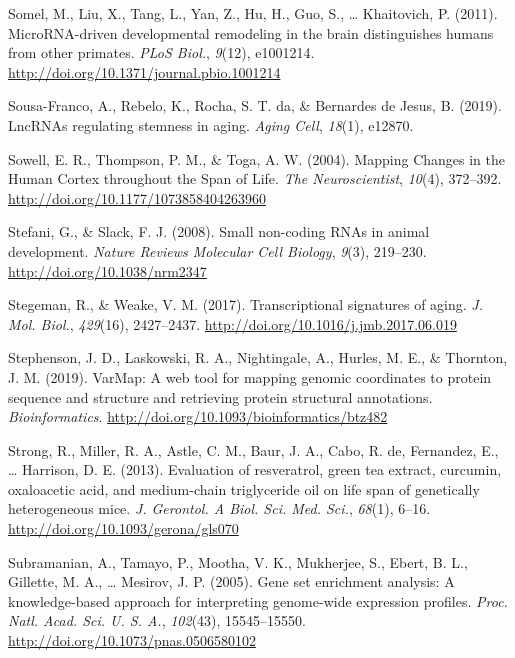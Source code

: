 \documentclass[12pt,twoside]{unicam}
\begin{document}
\begin{cslreferences}
\leavevmode\hypertarget{ref-Somel2011}{}%
Somel, M., Liu, X., Tang, L., Yan, Z., Hu, H., Guo, S., \ldots{} Khaitovich, P. (2011). MicroRNA-driven developmental remodeling in the brain distinguishes humans from other primates. \emph{PLoS Biol.}, \emph{9}(12), e1001214. \url{http://doi.org/10.1371/journal.pbio.1001214}

\leavevmode\hypertarget{ref-Sousa-Franco2019}{}%
Sousa-Franco, A., Rebelo, K., Rocha, S. T. da, \& Bernardes de Jesus, B. (2019). LncRNAs regulating stemness in aging. \emph{Aging Cell}, \emph{18}(1), e12870.

\leavevmode\hypertarget{ref-Sowell2004}{}%
Sowell, E. R., Thompson, P. M., \& Toga, A. W. (2004). Mapping Changes in the Human Cortex throughout the Span of Life. \emph{The Neuroscientist}, \emph{10}(4), 372--392. \url{http://doi.org/10.1177/1073858404263960}

\leavevmode\hypertarget{ref-Stefani2008}{}%
Stefani, G., \& Slack, F. J. (2008). Small non-coding RNAs in animal development. \emph{Nature Reviews Molecular Cell Biology}, \emph{9}(3), 219--230. \url{http://doi.org/10.1038/nrm2347}

\leavevmode\hypertarget{ref-Stegeman2017}{}%
Stegeman, R., \& Weake, V. M. (2017). Transcriptional signatures of aging. \emph{J. Mol. Biol.}, \emph{429}(16), 2427--2437. \url{http://doi.org/10.1016/j.jmb.2017.06.019}

\leavevmode\hypertarget{ref-Stephenson2019}{}%
Stephenson, J. D., Laskowski, R. A., Nightingale, A., Hurles, M. E., \& Thornton, J. M. (2019). VarMap: A web tool for mapping genomic coordinates to protein sequence and structure and retrieving protein structural annotations. \emph{Bioinformatics}. \url{http://doi.org/10.1093/bioinformatics/btz482}

\leavevmode\hypertarget{ref-Strong2013}{}%
Strong, R., Miller, R. A., Astle, C. M., Baur, J. A., Cabo, R. de, Fernandez, E., \ldots{} Harrison, D. E. (2013). Evaluation of resveratrol, green tea extract, curcumin, oxaloacetic acid, and medium-chain triglyceride oil on life span of genetically heterogeneous mice. \emph{J. Gerontol. A Biol. Sci. Med. Sci.}, \emph{68}(1), 6--16. \url{http://doi.org/10.1093/gerona/gls070}

\leavevmode\hypertarget{ref-Subramanian2005}{}%
Subramanian, A., Tamayo, P., Mootha, V. K., Mukherjee, S., Ebert, B. L., Gillette, M. A., \ldots{} Mesirov, J. P. (2005). Gene set enrichment analysis: A knowledge-based approach for interpreting genome-wide expression profiles. \emph{Proc. Natl. Acad. Sci. U. S. A.}, \emph{102}(43), 15545--15550. \url{http://doi.org/10.1073/pnas.0506580102}


\end{cslreferences}
\end{document}
